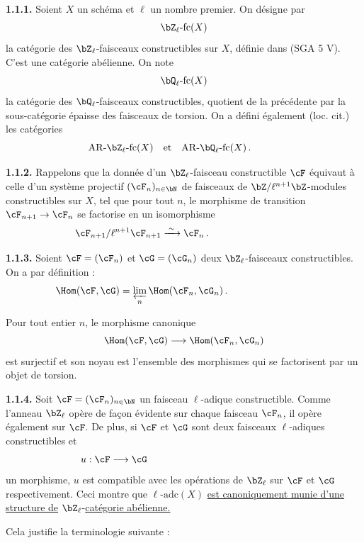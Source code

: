 \noindent
\textbf{1.1.1.} Soient $X$ un sch\'ema et $\ell$ un nombre premier. On d\'esigne par
\[
\bZ_{\ell}\text{-}\mathrm{fc}(X)
\]
la cat\'egorie des $\bZ_{\ell}$-faisceaux constructibles sur $X$, d\'efinie dans (SGA 5 V). C'est une cat\'egorie ab\'elienne. On note
\[
\bQ_{\ell}\text{-}\mathrm{fc}(X)
\]
la cat\'egorie des $\bQ_{\ell}$-faisceaux constructibles, quotient de la pr\'ec\'edente par la sous-cat\'egorie \'epaisse des faisceaux de torsion. On a d\'efini \'egalement (loc. cit.) les cat\'egories
\[
\mathrm{AR}\text{-}\bZ_{\ell}\text{-}\mathrm{fc}(X) \quad \text{et} \quad \mathrm{AR}\text{-}\bQ_{\ell}\text{-}\mathrm{fc}(X)\,.\hspace*{1cm}
\]

\noindent
\textbf{1.1.2.} Rappelons que la donn\'ee d'un $\bZ_{\ell}$-faisceau constructible $\cF$ \'equivaut \`a celle d'un syst\`eme projectif $(\cF_n)_{n \in \bN}$ de faisceaux de $\bZ/\ell^{n+1}\bZ$-modules constructibles sur $X$, tel que pour tout $n$, le morphisme de transition $\cF_{n+1} \rightarrow \cF_n$ se factorise en un isomorphisme
\[
\cF_{n+1}/\ell^{n+1}\cF_{n+1} \xrightarrow{\;\sim\;} \cF_n\,.\hspace*{3cm}
\]

\noindent
\textbf{1.1.3.} Soient $\cF = (\cF_n)$ et $\cG = (\cG_n)$ deux $\bZ_{\ell}$-faisceaux constructibles. On a par d\'efinition :
\[
\Hom(\cF, \cG) = \varprojlim_{n} \Hom(\cF_n, \cG_n)\,.\hspace*{3cm}
\]

Pour tout entier $n$, le morphisme canonique
\[
\Hom(\cF, \cG) \longrightarrow \Hom(\cF_n, \cG_n)
\]
est surjectif et son noyau est l'ensemble des morphismes qui se factorisent par un objet de torsion.

\smallskip

\noindent
\textbf{1.1.4.} Soit $\cF = (\cF_n)_{n \in \bN}$ un faisceau $\ell$-adique constructible. Comme l'anneau $\bZ_{\ell}$ op\`ere de fa\c con \'evidente sur chaque faisceau $\cF_n$, il op\`ere \'egalement sur $\cF$. De plus, si $\cF$ et $\cG$ sont deux faisceaux $\ell$-adiques constructibles et
\[
u : \cF \longrightarrow \cG\hspace*{5cm}
\]
un morphisme, $u$ est compatible avec les op\'erations de $\bZ_{\ell}$ sur $\cF$ et $\cG$ respectivement. Ceci montre que $\ell\text{-}\mathrm{adc}(X)$ \underline{est canoniquement munie d'une structure de} $\bZ_{\ell}$-\underline{cat\'egorie ab\'elienne.}

Cela justifie la terminologie suivante :

